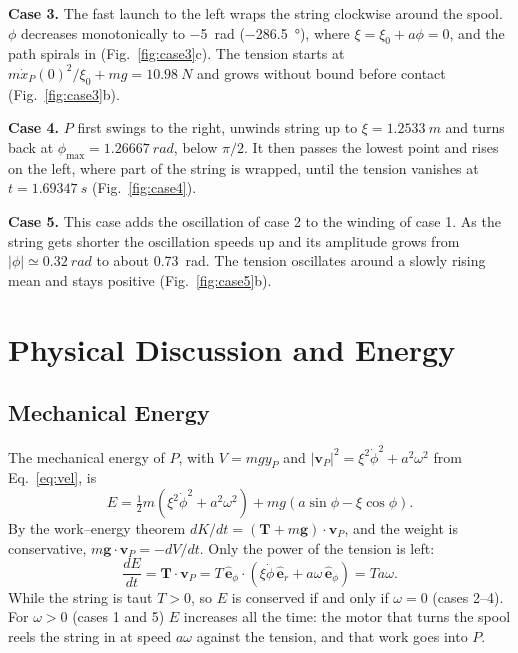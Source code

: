 \documentclass[11pt,a4paper]{article}
\numberwithin{equation}{section}
\newcommand{\er}{\hat{\mathbf{e}}_r}
\newcommand{\ephi}{\hat{\mathbf{e}}_\phi}
\newcommand{\vect}[1]{\mathbf{#1}}
\begin{document}
\textbf{Case 3.} The fast launch to the left wraps the string clockwise around the spool. $\phi$ decreases monotonically to \SI{-5}{rad} (\SI{-286.5}{\degree}), where $\xi=\xi_0+a\phi=0$, and the path spirals in (Fig.~\ref{fig:case3}c). The tension starts at $m\dot x_P(0)^2/\xi_0+mg=\SI{10.98}{N}$ and grows without bound before contact (Fig.~\ref{fig:case3}b).

\textbf{Case 4.} $P$ first swings to the right, unwinds string up to $\xi=\SI{1.2533}{m}$ and turns back at $\phi_\mathrm{max}=\SI{1.26667}{rad}$, below $\pi/2$. It then passes the lowest point and rises on the left, where part of the string is wrapped, until the tension vanishes at $t=\SI{1.69347}{s}$ (Fig.~\ref{fig:case4}).

\textbf{Case 5.} This case adds the oscillation of case 2 to the winding of case 1. As the string gets shorter the oscillation speeds up and its amplitude grows from $|\phi|\simeq\SI{0.32}{rad}$ to about \SI{0.73}{rad}. The tension oscillates around a slowly rising mean and stays positive (Fig.~\ref{fig:case5}b).

\section{Physical Discussion and Energy}

\subsection{Mechanical Energy}

The mechanical energy of $P$, with $V=mgy_P$ and $|\vect v_P|^2=\xi^2\dot\phi^2+a^2\omega^2$ from Eq.~\eqref{eq:vel}, is
\begin{equation}
  E = \tfrac12 m\left(\xi^2\dot\phi^2 + a^2\omega^2\right) + mg\left(a\sin\phi - \xi\cos\phi\right). \label{eq:energy}
\end{equation}
By the work--energy theorem $dK/dt=(\vect T+m\vect g)\cdot\vect v_P$, and the weight is conservative, $m\vect g\cdot\vect v_P=-dV/dt$. Only the power of the tension is left:
\begin{equation}
  \frac{dE}{dt} = \vect T\cdot\vect v_P = T\,\ephi\cdot\left(\xi\dot\phi\,\er + a\omega\,\ephi\right) = Ta\omega. \label{eq:power}
\end{equation}
While the string is taut $T>0$, so $E$ is conserved if and only if $\omega=0$ (cases 2--4). For $\omega>0$ (cases 1 and 5) $E$ increases all the time: the motor that turns the spool reels the string in at speed $a\omega$ against the tension, and that work goes into $P$.
\end{document}
